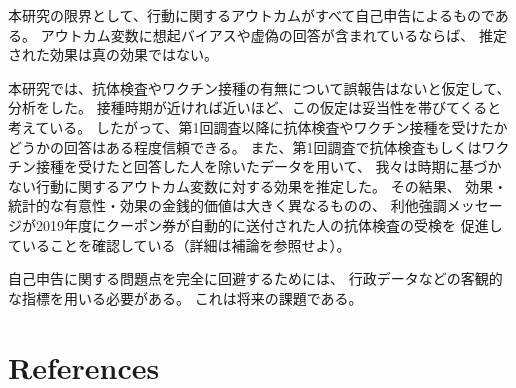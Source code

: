 \documentclass[
  11pt,
  a4paper,
]{article}
\begin{document}
本研究の限界として、行動に関するアウトカムがすべて自己申告によるものである。
アウトカム変数に想起バイアスや虚偽の回答が含まれているならば、
推定された効果は真の効果ではない。

本研究では、抗体検査やワクチン接種の有無について誤報告はないと仮定して、分析をした。
接種時期が近ければ近いほど、この仮定は妥当性を帯びてくると考えている。
したがって、第1回調査以降に抗体検査やワクチン接種を受けたかどうかの回答はある程度信頼できる。
また、第1回調査で抗体検査もしくはワクチン接種を受けたと回答した人を除いたデータを用いて、
我々は時期に基づかない行動に関するアウトカム変数に対する効果を推定した。
その結果、
効果・統計的な有意性・効果の金銭的価値は大きく異なるものの、
利他強調メッセージが2019年度にクーポン券が自動的に送付された人の抗体検査の受検を
促進していることを確認している（詳細は補論を参照せよ）。

自己申告に関する問題点を完全に回避するためには、
行政データなどの客観的な指標を用いる必要がある。
これは将来の課題である。

\newpage

\hypertarget{references}{%
\section*{References}\label{references}}
\end{document}
